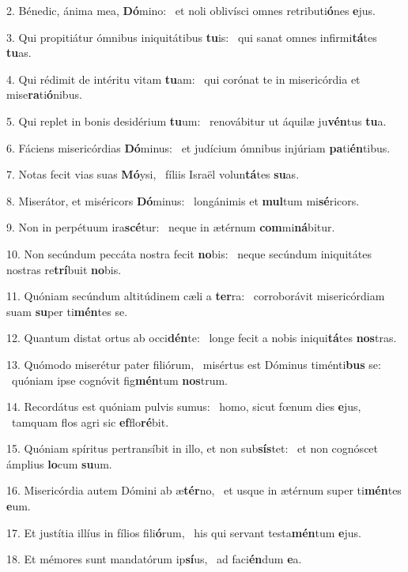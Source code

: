 2. Bénedic, ánima mea, \textbf{Dó}mino: \ast\  et noli oblivísci omnes retributi\textbf{ó}nes \textbf{e}jus.\

3. Qui propitiátur ómnibus iniquitátibus \textbf{tu}is: \ast\  qui sanat omnes infirmi\textbf{tá}tes \textbf{tu}as.\

4. Qui rédimit de intéritu vitam \textbf{tu}am: \ast\  qui corónat te in misericórdia et mise\textbf{ra}ti\textbf{ó}nibus.\

5. Qui replet in bonis desidérium \textbf{tu}um: \ast\  renovábitur ut áquilæ ju\textbf{vén}tus \textbf{tu}a.\

6. Fáciens misericórdias \textbf{Dó}minus: \ast\  et judícium ómnibus injúriam \textbf{pa}ti\textbf{én}tibus.\

7. Notas fecit vias suas \textbf{Mó}ysi, \ast\  fíliis Israël volun\textbf{tá}tes \textbf{su}as.\

8. Miserátor, et miséricors \textbf{Dó}minus: \ast\  longánimis et \textbf{mul}tum mi\textbf{sé}ricors.\

9. Non in perpétuum ira\textbf{scé}tur: \ast\  neque in ætérnum \textbf{com}mi\textbf{ná}bitur.\

10. Non secúndum peccáta nostra fecit \textbf{no}bis: \ast\  neque secúndum iniquitátes nostras re\textbf{trí}buit \textbf{no}bis.\

11. Quóniam secúndum altitúdinem cæli a \textbf{ter}ra: \ast\  corroborávit misericórdiam suam \textbf{su}per ti\textbf{mén}tes se.\

12. Quantum distat ortus ab occi\textbf{dén}te: \ast\  longe fecit a nobis iniqui\textbf{tá}tes \textbf{nos}tras.\

13. Quómodo miserétur pater filiórum, \dag\  misértus est Dóminus timénti\textbf{bus} se: \ast\  quóniam ipse cognóvit fig\textbf{mén}tum \textbf{nos}trum.\

14. Recordátus est quóniam pulvis sumus: \dag\  homo, sicut fœnum dies \textbf{e}jus, \ast\  tamquam flos agri sic \textbf{ef}flo\textbf{ré}bit.\

15. Quóniam spíritus pertransíbit in illo, et non sub\textbf{sís}tet: \ast\  et non cognóscet ámplius \textbf{lo}cum \textbf{su}um.\

16. Misericórdia autem Dómini ab æ\textbf{tér}no, \ast\  et usque in ætérnum super ti\textbf{mén}tes \textbf{e}um.\

17. Et justítia illíus in fílios fili\textbf{ó}rum, \ast\  his qui servant testa\textbf{mén}tum \textbf{e}jus.\

18. Et mémores sunt mandatórum ip\textbf{sí}us, \ast\  ad faci\textbf{én}dum \textbf{e}a.\

